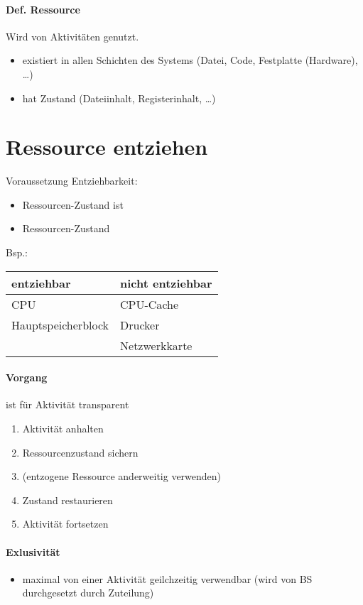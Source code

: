 \paragraph{Def. Ressource}
Wird von Aktivitäten genutzt.
\begin{itemize}
\item existiert in allen Schichten des Systems (Datei, Code, Festplatte (Hardware), …)
\item hat Zustand (Dateiinhalt, Registerinhalt, …)
\end{itemize}
\section{Ressource entziehen}
Voraussetzung Entziehbarkeit:
\begin{itemize}
\item Ressourcen-Zustand ist 
\item Ressourcen-Zustand 
\end{itemize}
Bsp.:\\
\begin{tabular}{l | l}
entziehbar & nicht entziehbar\\
\hline
CPU & CPU-Cache\\
Hauptspeicherblock & Drucker\\
& Netzwerkkarte
\end{tabular}
\paragraph{Vorgang} ist für Aktivität transparent
\begin{enumerate}
\item Aktivität anhalten
\item Ressourcenzustand sichern
\item (entzogene Ressource anderweitig verwenden)
\item Zustand restaurieren
\item Aktivität fortsetzen
\end{enumerate}
\paragraph{Exlusivität} 
\begin{itemize}
\item maximal von einer Aktivität geilchzeitig verwendbar (wird von BS durchgesetzt durch Zuteilung)
\end{itemize}
